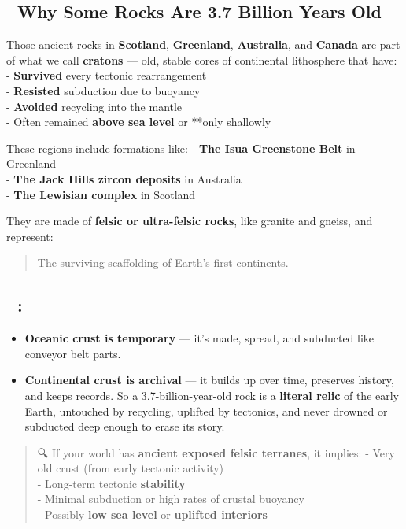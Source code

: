 \documentclass[
  letterpaper,
]{book}
\providecommand{\tightlist}{%
  \setlength{\itemsep}{0pt}\setlength{\parskip}{0pt}}
\begin{document}
\subsection{🧓 Why Some Rocks Are 3.7 Billion Years
Old}\label{why-some-rocks-are-3.7-billion-years-old}

Those ancient rocks in \textbf{Scotland}, \textbf{Greenland},
\textbf{Australia}, and \textbf{Canada} are part of what we call
\textbf{cratons} --- old, stable cores of continental lithosphere that
have: - \textbf{Survived} every tectonic rearrangement\\
- \textbf{Resisted} subduction due to buoyancy\\
- \textbf{Avoided} recycling into the mantle\\
- Often remained \textbf{above sea level} or **only shallowly

These regions include formations like: - \textbf{The Isua Greenstone
Belt} in Greenland\\
- \textbf{The Jack Hills zircon deposits} in Australia\\
- \textbf{The Lewisian complex} in Scotland

They are made of \textbf{felsic or ultra-felsic rocks}, like granite and
gneiss, and represent:

\begin{quote}
The surviving scaffolding of Earth's first continents.
\end{quote}

\subsection{🧭 :}\label{section}

\begin{itemize}
\tightlist
\item
  \textbf{Oceanic crust is temporary} --- it's made, spread, and
  subducted like conveyor belt parts.\\
\item
  \textbf{Continental crust is archival} --- it builds up over time,
  preserves history, and keeps records. So a 3.7-billion-year-old rock
  is a \textbf{literal relic} of the early Earth, untouched by
  recycling, uplifted by tectonics, and never drowned or subducted deep
  enough to erase its story.
\end{itemize}

\begin{quote}
🔍 If your world has \textbf{ancient exposed felsic terranes}, it
implies: - Very old crust (from early tectonic activity)\\
- Long-term tectonic \textbf{stability}\\
- Minimal subduction or high rates of crustal buoyancy\\
- Possibly \textbf{low sea level} or \textbf{uplifted interiors}
\end{quote}
\end{document}
